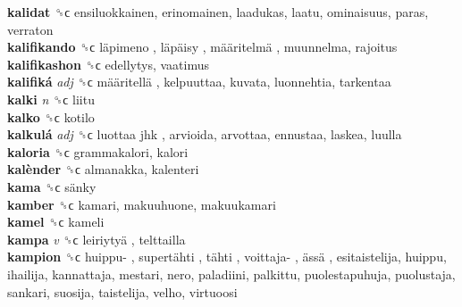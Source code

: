 \textbf{kalidat} ␝ϲ  ensiluokkainen, erinomainen, laadukas, laatu, ominaisuus, paras, verraton  \\
\textbf{kalifikando} ␝ϲ   läpimeno ,  läpäisy ,  määritelmä , muunnelma, rajoitus  \\
\textbf{kalifikashon} ␝ϲ  edellytys, vaatimus  \\
\textbf{kalifiká} \emph{adj}  ␝ϲ   määritellä , kelpuuttaa, kuvata, luonnehtia, tarkentaa  \\
\textbf{kalki} \emph{n}  ␝ϲ  liitu  \\
\textbf{kalko} ␝ϲ  kotilo  \\
\textbf{kalkulá} \emph{adj}  ␝ϲ   luottaa jhk , arvioida, arvottaa, ennustaa, laskea, luulla  \\
\textbf{kaloria} ␝ϲ  grammakalori, kalori  \\
\textbf{kalènder} ␝ϲ  almanakka, kalenteri  \\
\textbf{kama} ␝ϲ   sänky   \\
\textbf{kamber} ␝ϲ  kamari, makuuhuone, makuukamari  \\
\textbf{kamel} ␝ϲ  kameli  \\
\textbf{kampa} \emph{v}  ␝ϲ   leiriytyä , telttailla  \\
\textbf{kampion} ␝ϲ   huippu- ,  supertähti ,  tähti ,  voittaja- ,  ässä , esitaistelija, huippu, ihailija, kannattaja, mestari, nero, paladiini, palkittu, puolestapuhuja, puolustaja, sankari, suosija, taistelija, velho, virtuoosi  \\
